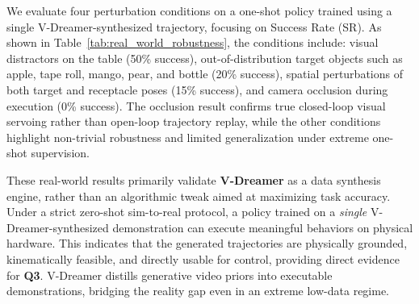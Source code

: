 We evaluate four perturbation conditions on a one-shot policy trained using a single V-Dreamer-synthesized trajectory, focusing on Success Rate (SR). As shown in Table~\ref{tab:real_world_robustness}, the conditions include: visual distractors on the table (50\% success), out-of-distribution target objects such as apple, tape roll, mango, pear, and bottle (20\% success), spatial perturbations of both target and receptacle poses (15\% success), and camera occlusion during execution (0\% success). The occlusion result confirms true closed-loop visual servoing rather than open-loop trajectory replay, while the other conditions highlight non-trivial robustness and limited generalization under extreme one-shot supervision.

These real-world results primarily validate \textbf{V-Dreamer} as a data synthesis engine, rather than an algorithmic tweak aimed at maximizing task accuracy. Under a strict zero-shot sim-to-real protocol, a policy trained on a \emph{single} V-Dreamer-synthesized demonstration can execute meaningful behaviors on physical hardware. This indicates that the generated trajectories are physically grounded, kinematically feasible, and directly usable for control, providing direct evidence for \textbf{Q3}. V-Dreamer distills generative video priors into executable demonstrations, bridging the reality gap even in an extreme low-data regime.





